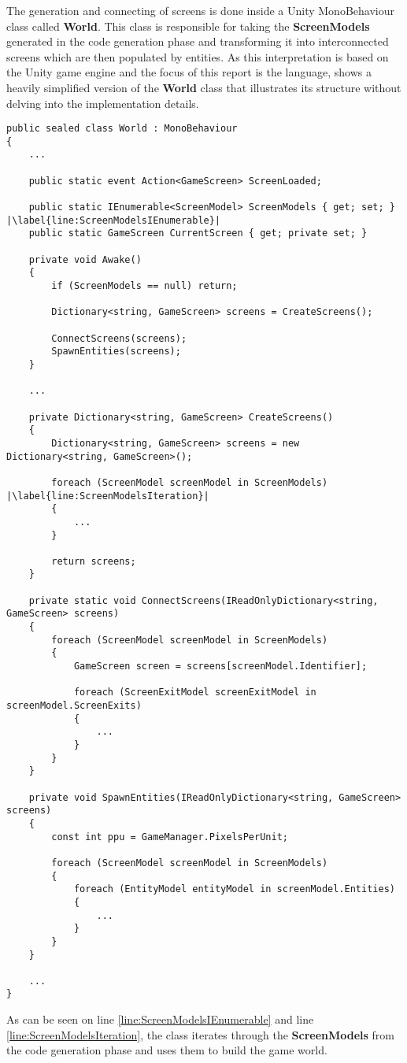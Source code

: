 The generation and connecting of screens is done inside a Unity MonoBehaviour class called \textbf{World}.
This class is responsible for taking the \textbf{ScreenModels} generated in the code generation phase and transforming it into interconnected screens which are then populated by entities. 
As this interpretation is based on the Unity game engine and the focus of this report is the \dazel{} language, 
 shows a heavily simplified version of the \textbf{World} class that illustrates its structure without delving into the implementation details.

\begin{lstlisting}[language=CSharp, caption={}, label={lst:WorldClassUnity},escapechar=|]
public sealed class World : MonoBehaviour
{
	...

    public static event Action<GameScreen> ScreenLoaded;
    
    public static IEnumerable<ScreenModel> ScreenModels { get; set; } |\label{line:ScreenModelsIEnumerable}|
    public static GameScreen CurrentScreen { get; private set; }
    
    private void Awake()
    {
        if (ScreenModels == null) return;
        
        Dictionary<string, GameScreen> screens = CreateScreens();

        ConnectScreens(screens);
        SpawnEntities(screens);
    }

	...

    private Dictionary<string, GameScreen> CreateScreens()
    {
        Dictionary<string, GameScreen> screens = new Dictionary<string, GameScreen>();

        foreach (ScreenModel screenModel in ScreenModels) |\label{line:ScreenModelsIteration}|
        {
			...
        }

        return screens;
    }

    private static void ConnectScreens(IReadOnlyDictionary<string, GameScreen> screens)
    {
        foreach (ScreenModel screenModel in ScreenModels) 
        {
            GameScreen screen = screens[screenModel.Identifier];

            foreach (ScreenExitModel screenExitModel in screenModel.ScreenExits)
            {
				...
            }
        }
    }

    private void SpawnEntities(IReadOnlyDictionary<string, GameScreen> screens)
    {
        const int ppu = GameManager.PixelsPerUnit;
        
        foreach (ScreenModel screenModel in ScreenModels)
        {
            foreach (EntityModel entityModel in screenModel.Entities)
            {
				...
            }
        }
    }
	
	...
}
\end{lstlisting}

As can be seen on line \ref{line:ScreenModelsIEnumerable} and line \ref{line:ScreenModelsIteration}, the class iterates through the \textbf{ScreenModels} from the code generation phase and uses them to build the game world.